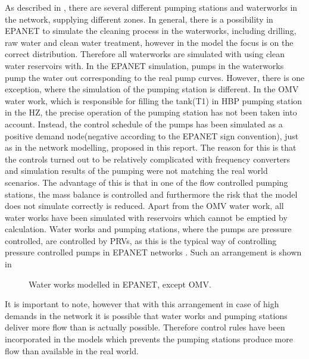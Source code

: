 As described in , there are several different pumping stations and waterworks in the network, supplying different zones. In general, there is a possibility in EPANET to simulate the cleaning process in the waterworks, including drilling, raw water and clean water treatment, however in the model the focus is on the correct distribution. Therefore all waterworks are simulated with using clean water reservoirs with. In the EPANET simulation, pumps in the waterworks pump the water out corresponding to the real pump curves. However, there is one exception, where the simulation of the pumping station is different. In the OMV water work, which is responsible for filling the tank(T1) in HBP pumping station in the HZ, the precise operation of the pumping station has not been taken into account. Instead, the control schedule of the pumps has been simulated as a positive demand node(negative according to the EPANET sign convention), just as in the network modelling, proposed in this report. The reason for this is that the controls turned out to be relatively complicated with frequency converters and simulation results of the pumping were not matching the real world scenarios. The advantage of this is that in one of the flow controlled pumping stations, the mass balance is controlled and furthermore the risk that the model does not simulate correctly is reduced. 
Apart from the OMV water work, all water works have been simulated with reservoirs which cannot be emptied by calculation. Water works and pumping stations, where the pumps are pressure controlled, are controlled by PRVs, as this is the typical way of controlling pressure controlled pumps in EPANET networks \cite{agency2016epanet}. Such an arrangement is shown in  

\begin{figure}[H]
\centering
 
\caption{Water works modelled in EPANET, except OMV.}
\label{fig:PRV_EPANET}
\end{figure}

\vspace{-4mm}
It is important to note, however that with this arrangement in case of high demands in the network it is possible that water works and pumping stations deliver more flow than is actually possible. Therefore control rules have been incorporated in the models which prevents the pumping stations produce more flow than available in the real world. 

